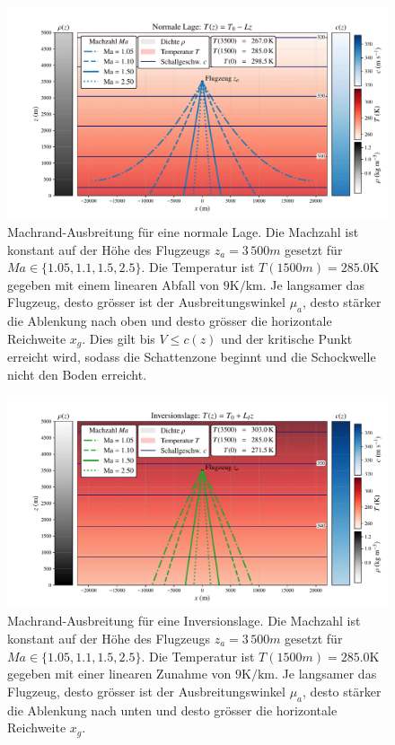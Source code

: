 \begin{figure}
    \centering
    \includegraphics[width=\textwidth]{papers/schall/figures/normal_sidepanels.pdf}
    \caption{Machrand-Ausbreitung für eine normale Lage. Die Machzahl
    ist konstant auf der Höhe des Flugzeugs $z_a=3\,500 m$ gesetzt für
    $\textit{Ma} \in \{1.05, 1.1, 1.5, 2.5 \}$.
    Die Temperatur ist $T(1500 m) = 285.0 \mathrm{K}$ gegeben mit einem
    linearen Abfall von $9 \mathrm{K/km}$.
    Je langsamer das Flugzeug, desto grösser ist der Ausbreitungswinkel
    $\mu_a$, desto stärker die Ablenkung nach oben und desto grösser
    die horizontale Reichweite $x_g$.
    Dies gilt bis $V\le c(z)$ und der kritische Punkt erreicht wird,
    sodass die Schattenzone beginnt und die Schockwelle nicht den
    Boden erreicht.}
    \label{fig:schall:norm-lage}
\end{figure}

\begin{figure}
    \centering
    \includegraphics[width=\textwidth]{papers/schall/figures/inversion_sidepanels.pdf}
    \caption{Machrand-Ausbreitung für eine Inversionslage. Die Machzahl
    ist konstant auf der Höhe des Flugzeugs $z_a=3\,500 m$ gesetzt für
    $\textit{Ma} \in \{1.05, 1.1, 1.5, 2.5 \}$.
    Die Temperatur ist $T(1500 m) = 285.0 \mathrm{K}$ gegeben mit einer
    linearen Zunahme von $9 \mathrm{K/km}$.
    Je langsamer das Flugzeug, desto grösser ist der Ausbreitungswinkel
    $\mu_a$, desto stärker die Ablenkung nach unten und desto
    grösser die horizontale Reichweite $x_g$.}
    \label{fig:schall:inv-lage}
\end{figure}

